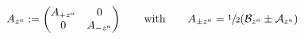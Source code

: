 \begin{equation}\label{eq:defa}
 A_{z^a}:=\begin{pmatrix} A_{+z^a} & 0\\ 0 & A_{-z^a}\end{pmatrix}
 \qquad\text{with}\qquad A_{\pm z^a}=\sfrac{1}{2}(\mathcal{B}_{z^a}
 \pm\mathcal{A}_{z^a})
\end{equation}

